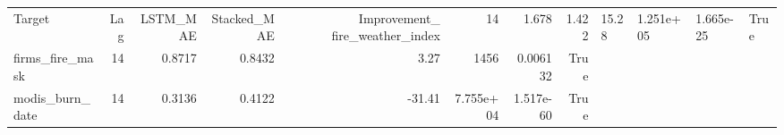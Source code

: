 \begin{tabular}{lrrrrrrr}
\toprule
Target & Lag & LSTM_MAE & Stacked_MAE & Improvement_%
\midrule
fire_weather_index & 14 & 1.678 & 1.422 & 15.28 & 1.251e+05 & 1.665e-25 & True \\
firms_fire_mask & 14 & 0.8717 & 0.8432 & 3.27 & 1456 & 0.006132 & True \\
modis_burn_date & 14 & 0.3136 & 0.4122 & -31.41 & 7.755e+04 & 1.517e-60 & True \\
\bottomrule
\end{tabular}
